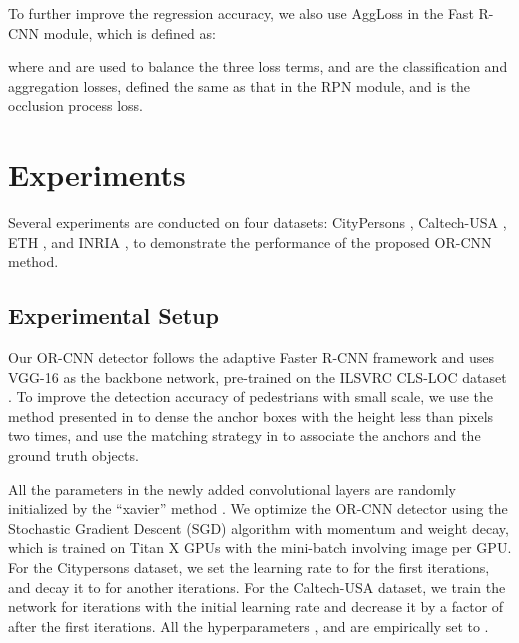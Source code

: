 \documentclass[runningheads]{llncs}
\begin{document}
To further improve the regression accuracy, we also use AggLoss in the Fast R-CNN module, which is defined as:

where  and  are used to balance the three loss terms,  and  are the classification and aggregation losses, defined the same as that in the RPN module, and  is the occlusion process loss.

\section{Experiments}
Several experiments are conducted on four datasets: CityPersons \cite{DBLP:conf/cvpr/ZhangBS17}, Caltech-USA \cite{DBLP:journals/pami/DollarWSP12}, ETH \cite{DBLP:conf/iccv/EssLG07}, and INRIA \cite{DBLP:conf/cvpr/DalalT05}, to demonstrate the performance of the proposed OR-CNN method.

\subsection{Experimental Setup}
\label{subsec:imp-details}
Our OR-CNN detector follows the adaptive Faster R-CNN framework \cite{DBLP:conf/cvpr/ZhangBS17} and uses VGG-16 \cite{DBLP:journals/corr/SimonyanZ14a} as the backbone network, pre-trained on the ILSVRC CLS-LOC dataset \cite{DBLP:conf/nips/KrizhevskySH12}. To improve the detection accuracy of pedestrians with small scale, we use the method presented in \cite{DBLP:conf/ijcb/abs-1708-05234,DBLP:conf/ccbr/ZhangZLSWL17} to dense the anchor boxes with the height less than  pixels two times, and use the matching strategy in \cite{DBLP:conf/iccv/abs-1708-05237} to associate the anchors and the ground truth objects.

All the parameters in the newly added convolutional layers are randomly initialized by the ``xavier'' method \cite{DBLP:journals/jmlr/GlorotB10}. We optimize the OR-CNN detector using the Stochastic Gradient Descent (SGD) algorithm with  momentum and  weight decay, which is trained on  Titan X GPUs with the mini-batch involving  image per GPU. For the Citypersons dataset, we set the learning rate to  for the first  iterations, and decay it to  for another  iterations. For the Caltech-USA dataset, we train the network for  iterations with the initial learning rate  and decrease it by a factor of  after the first  iterations. All the hyperparameters ,  and  are empirically set to .
\end{document}
